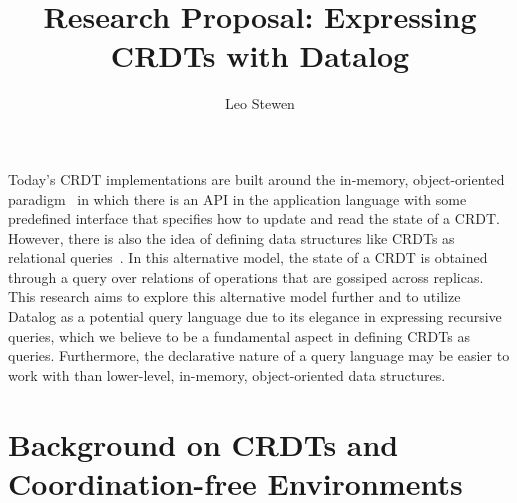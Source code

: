 \documentclass{article}
\begin{document}
\title{Research Proposal: Expressing CRDTs with Datalog}
\author{Leo Stewen}

\maketitle

Today's CRDT implementations are built around the in-memory,
object-oriented paradigm~\cite{laddad2022keep} in which there is an API
in the application language with some predefined interface that
specifies how to update and read the state of a CRDT.
However, there is also the idea of defining data structures like CRDTs
as relational queries~\cite{kleppmann2018data}.
In this alternative model, the state of a CRDT is obtained through a query over
relations of operations that are gossiped across replicas.
This research aims to explore this alternative model further and
to utilize Datalog as a potential query language due to its elegance in
expressing recursive queries, which we believe to be a fundamental aspect in
defining CRDTs as queries.
Furthermore, the declarative nature of a query language may be easier to work
with than lower-level, in-memory, object-oriented data structures.

\section{Background on CRDTs and Coordination-free Environments}
\end{document}
